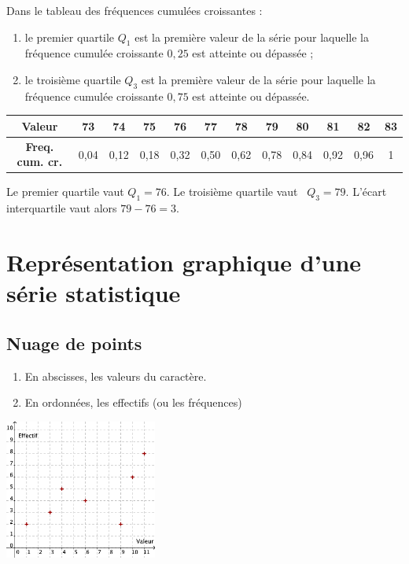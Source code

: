 Dans le tableau des fréquences cumulées croissantes :
\begin{enumerate}
\item le premier quartile $Q_1$ est la première valeur de la série
  pour laquelle la fréquence cumulée croissante $0,25$ est atteinte ou
  dépassée ;
\item le troisième quartile $Q_3$ est la première valeur de la série
  pour laquelle la fréquence cumulée croissante $0,75$ est atteinte ou
  dépassée.
\end{enumerate}


\begin{center}
\begin{tabular}[h]{|c||c|c|c|c|c|c|c|c|c|c|c|}
    \hline
  \textbf{Valeur} & 73 & 74 & 75 & 76 & 77 & 78 & 79 & 80 & 81 &
  82 & 83 \\
  \hline
  \textbf{Freq. cum. cr.} & 0,04 & 0,12 & 0,18 & 0,32 & 0,50 & 0,62 & 0,78 &
  0,84 & 0,92 & 0,96 & 1 \\ 
  \hline
\end{tabular}
\end{center}

Le premier quartile vaut $Q_1=76$. Le troisième quartile vaut \ $Q_3=79$. L'écart interquartile vaut alors \( 79-76=3\).



\section{Représentation graphique d'une série statistique}


\begin{multicols}{2}
\subsection{Nuage de points}
  \begin{enumerate}
  \item En abscisses, les valeurs du caractère.
  \item En ordonnées, les effectifs (ou les fréquences)
  \end{enumerate}
  \columnbreak
  \includegraphics[width=5cm]{Stats_Fig4_Nuage.png}
\end{multicols}

